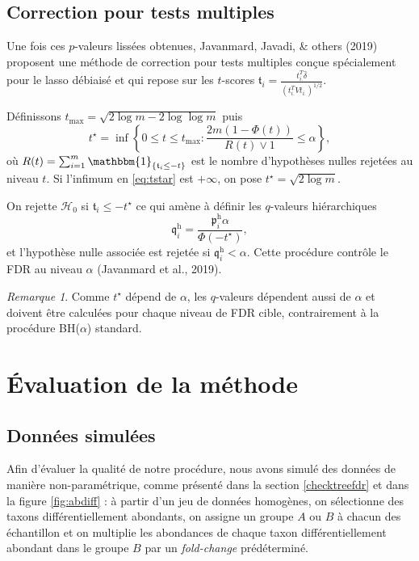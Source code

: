 \documentclass[12pt,a4paper]{reedthesis}
\newcommand \indic {\mathbbm{1}}
\newcommand \pv {\mathfrak{p}}
\newcommand \qv {\mathfrak{q}}
\newcommand \ts {\mathfrak{t}}
\newcommand \shifts {\delta}
\theoremstyle{definition}
\theoremstyle{definition}
\theoremstyle{definition}
\theoremstyle{remark}
\newtheorem*{remark}{Remarque}
\begin{document}
\hypertarget{correction-pour-tests-multiples}{%
\subsection{Correction pour tests multiples}\label{correction-pour-tests-multiples}}

Une fois ces \(p\)-valeurs lissées obtenues, Javanmard, Javadi, \& others (2019) proposent une méthode de correction pour tests multiples conçue spécialement pour le lasso débiaisé et qui repose sur les \(t\)-scores
\(\ts_i = \frac{t_{i.}^T\hat{\shifts}}{\left(t_{i.}^TVt_{i.}\right)^{1/2}}\).

Définissons \(t_{\text{max}} = \sqrt{2 \log m - 2 \log \log m}\) puis
\begin{equation}
\label{eq:tstar}
t^{\star} = \inf \left\{ 0 \leq t \leq t_{\max} : \frac{2m(1 - \Phi(t))}{R(t) \vee 1} \leq \alpha \right\},
\end{equation}
où \(R(t)= \sum_{i = 1}^m \indic_{\{\ts_i \leq -t\}}\) est le nombre d'hypothèses nulles rejetées au niveau \(t\). Si l'infimum en \eqref{eq:tstar} est \(+\infty\), on pose \(t^{\star} = \sqrt{2 \log m}\).

On rejette \(\mathcal{H}_0\) si \(\ts_i \leq -t^{\star}\) ce qui amène à définir les \(q\)-valeurs hiérarchiques
\begin{equation*}
\qv^{\text{h}}_i = \frac{\pv^{\text{h}}_i \alpha}{\Phi(-t^{\star})},
\end{equation*}
et l'hypothèse nulle associée est rejetée si \(\qv^{\text{h}}_i < \alpha\). Cette procédure contrôle le FDR au niveau \(\alpha\) (Javanmard et al., 2019).
\begin{remark}
{}Comme \(t^{\star}\) dépend de \(\alpha\), les \(q\)-valeurs dépendent aussi de \(\alpha\) et doivent être calculées pour chaque niveau de FDR cible, contrairement à la procédure BH(\(\alpha\)) standard.
\end{remark}
\hypertarget{evaluation}{%
\section{Évaluation de la méthode}\label{evaluation}}

\hypertarget{simuzazou}{%
\subsection{Données simulées}\label{simuzazou}}

Afin d'évaluer la qualité de notre procédure, nous avons simulé des données de manière non-paramétrique, comme présenté dans la section \ref{checktreefdr} et dans la figure \ref{fig:abdiff} : à partir d'un jeu de données homogènes, on sélectionne des taxons différentiellement abondants, on assigne un groupe \(A\) ou \(B\) à chacun des échantillon et on multiplie les abondances de chaque taxon différentiellement abondant dans le groupe \(B\) par un \emph{fold-change} prédéterminé.
\end{document}

